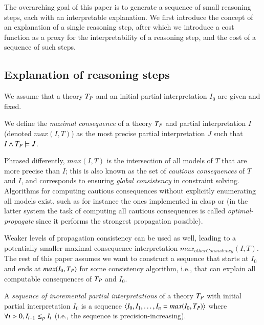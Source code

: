 
The overarching goal of this paper is to generate a sequence of small reasoning steps, each with an interpretable explanation. 
We first introduce the concept of an explanation of a single reasoning step, after which we introduce a cost function as a proxy for the interpretability of a reasoning step, and the cost of a sequence of such steps. 

\subsection{Explanation of reasoning steps}
We assume that a theory $T_P$ and an initial partial interpretation $I_0$ are given and fixed. 

\begin{definition}
We define the \emph{maximal consequence} of a theory $T_P$ and partial interpretation $I$ (denoted $max(I,T)$) as the most precise partial interpretation $J$ such that  $I \wedge T_P \models J$. 
\end{definition}

Phrased differently, $max(I,T)$ is the intersection of all models of $T$ that are more precise than $I$; this is also known as the set of \emph{cautious consequences} of $T$ and $I$, and corresponds to ensuring \emph{global consistency} in constraint solving.
Algorithms for computing cautious consequences without explicitly enumerating all models exist, such as for instance the ones implemented in clasp \cite{DBLP:conf/lpnmr/GebserKS09} or \idp \cite{IDP} (in the latter system the task of computing all cautious consequences is called \emph{optimal-propagate} since it performs the strongest propagation possible).

Weaker levels of propagation consistency can be used as well, leading to a potentially smaller maximal consequence interpretation $max_{\mathit{otherConsistency}}(I,T)$. 
The rest of this paper assumes we want to construct a sequence that starts at $I_0$ and ends at $max(I_0,T_P)$ for some consistency algorithm, i.e., that can explain all computable consequences of $T_P$ and $I_0$. 
\begin{definition}
A \emph{sequence of incremental partial interpretations} of a theory $T_P$ with initial partial interpretation $I_0$ is a sequence $\langle I_0, I_1, \ldots, I_n  = max(I_0,T_P)\rangle$ where $\forall i>0, I_{i-1} \leq_p I_{i}$ (i.e., the sequence is precision-increasing).
\end{definition} 

